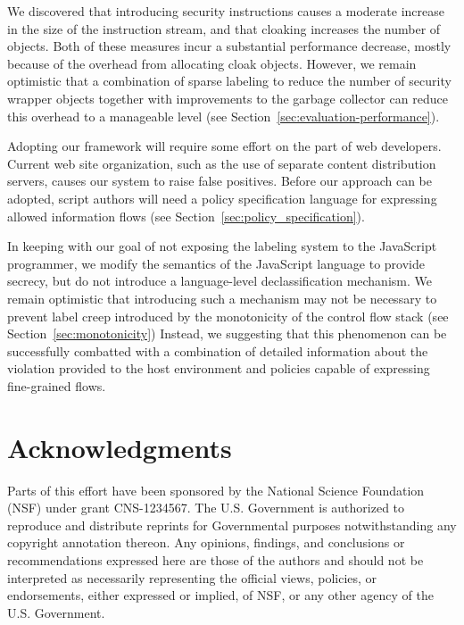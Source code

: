 \documentclass[preprint]{sigplanconf}
\begin{document}
We discovered that introducing security instructions causes a moderate increase in the size of the instruction stream, and that cloaking increases the number of objects.
Both of these measures incur a substantial performance decrease, mostly because of the overhead from allocating cloak objects.
However, we remain optimistic that a combination of sparse labeling to reduce the number of security wrapper objects together with improvements to the garbage collector can reduce this overhead to a manageable level (see Section~\ref{sec:evaluation-performance}).

Adopting our framework will require some effort on the part of web developers.
Current web site organization, such as the use of separate content distribution servers, causes our system to raise false positives.
Before our approach can be adopted, script authors will need a policy specification language for expressing allowed information flows (see Section~\ref{sec:policy_specification}).

In keeping with our goal of not exposing the labeling system to the JavaScript programmer, we modify the semantics of the JavaScript language to provide secrecy, but do not introduce a language-level declassification mechanism.
We remain optimistic that introducing such a mechanism may not be necessary to prevent label creep introduced by the monotonicity of the control flow stack (see Section~\ref{sec:monotonicity})
Instead, we suggesting that this phenomenon can be successfully combatted with a combination of detailed information about the violation provided to the host environment and policies capable of expressing fine-grained flows.


\section*{Acknowledgments}\label{acks}

Parts of this effort have been sponsored by the National Science Foundation (NSF) under grant CNS-1234567.
The U.S. Government is authorized to reproduce and distribute reprints for Governmental purposes notwithstanding any copyright annotation thereon.
Any opinions, findings, and conclusions or recommendations expressed here are those of the authors and should not be interpreted as necessarily representing the official views, policies, or endorsements, either expressed or implied, of NSF, or any other agency of the U.S. Government.

\balance



\end{document}
